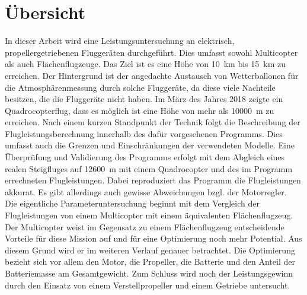 \chapter*{Übersicht}
In dieser Arbeit wird eine Leistungsuntersuchung an elektrisch, propellergetriebenen Fluggeräten durchgeführt. Dies umfasst sowohl Multicopter als auch Flächenflugzeuge. Das Ziel ist es eine Höhe von \SI{10}{km} bis \SI{15}{km} zu erreichen. Der Hintergrund ist der angedachte Austausch von Wetterballonen für die Atmosphärenmessung durch solche Fluggeräte, da diese viele Nachteile besitzen, die die Fluggeräte nicht haben. Im März des Jahres 2018 zeigte ein Quadrocopterflug, dass es möglich ist eine Höhe von mehr als \SI{10000}{m} zu erreichen. 
Nach einem kurzen Standpunkt der Technik folgt die Beschreibung der Flugleistungsberechnung innerhalb des dafür vorgesehenen Programms. Dies umfasst auch die Grenzen und Einschränkungen der verwendeten Modelle. Eine Überprüfung und Validierung des Programms erfolgt mit dem Abgleich eines realen Steigfluges auf \SI{12600}{m} mit einem Quadrocopter und des im Programm errechneten Flugleistungen. Dabei reproduziert das Programm die Flugleistungen akkurat. Es gibt allerdings auch gewisse Abweichungen bzgl. der Motorregler. \\
Die eigentliche Parameteruntersuchung beginnt mit dem Vergleich der Flugleistungen von einem Multicopter mit einem äquivalenten Flächenflugzeug. Der Multicopter weist im Gegensatz zu einem Flächenflugzeug entscheidende Vorteile für diese Mission auf und für eine Optimierung noch mehr Potential. Aus diesem Grund wird er im weiteren Verlauf genauer betrachtet. Die Optimierung bezieht sich vor allem den Motor, die Propeller, die Batterie und den Anteil der Batteriemasse am Gesamtgewicht. Zum Schluss wird noch der Leistungsgewinn durch den Einsatz von einem Verstellpropeller und einem Getriebe untersucht. 


